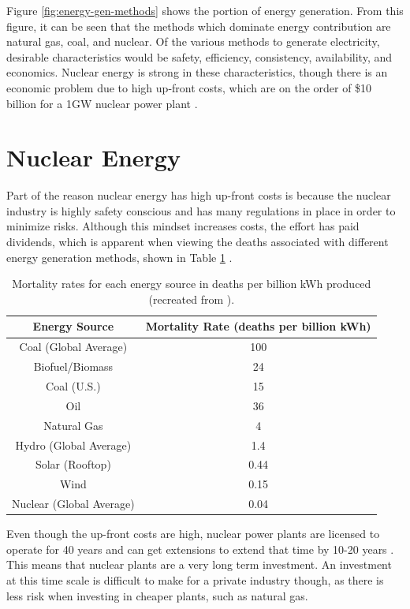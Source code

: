 Figure \ref{fig:energy-gen-methods} shows the portion of energy generation. From this figure, it can be seen that the methods which dominate energy contribution are natural gas, coal, and nuclear. Of the various methods to generate electricity, desirable characteristics would be safety, efficiency, consistency, availability, and economics. Nuclear energy is strong in these characteristics, though there is an economic problem due to high up-front costs, which are on the order of \$10 billion for a 1GW nuclear power plant \cite{du_update_2009}. 

\section{Nuclear Energy}

Part of the reason nuclear energy has high up-front costs is because the nuclear industry is highly safety conscious and has many regulations in place in order to minimize risks. Although this mindset increases costs, the effort has paid dividends, which is apparent when viewing the deaths associated with different energy generation methods, shown in Table \ref{tab:death-mega} \cite{brook_why_2014}.

\begin{table}[H]
\renewcommand{\arraystretch}{1.25}
\caption{Mortality rates for each energy source in deaths per billion kWh produced (recreated from \cite{brook_why_2014}).}
\label{tab:death-mega}
\begin{center}
\begin{tabular}{ | c | c | }
 \hline
 Energy Source & Mortality Rate (deaths per billion kWh)\\
 \hline
 \hline
 Coal (Global Average) & 100 \\
 Biofuel/Biomass & 24 \\
 Coal (U.S.) & 15 \\
 Oil & 36 \\
 Natural Gas & 4 \\
 Hydro (Global Average) & 1.4 \\
 Solar (Rooftop) & 0.44 \\
 Wind & 0.15 \\
 Nuclear (Global Average) & 0.04 \\
 
 \hline
\end{tabular}
\end{center}
\end{table}

Even though the up-front costs are high, nuclear power plants are licensed to operate for 40 years and can get extensions to extend that time by 10-20 years \cite{bredimas_international_2008}. This means that nuclear plants are a very long term investment. An investment at this time scale is difficult to make for a private industry though, as there is less risk when investing in cheaper plants, such as natural gas. 

